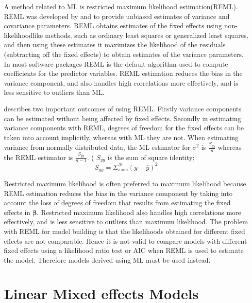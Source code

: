 \documentclass[12pt, a4paper]{report}
\theoremstyle{plain}
\theoremstyle{definition}
\theoremstyle{remark}
\begin{document}
A method related to ML is restricted maximum likelihood
estimation(REML). REML was developed by \citet*{PT71} and
\citet{Harville} to provide unbiased estimates of variance and
covariance parameters. REML obtains estimates of the fixed effects
using non-likelihoodlike methods, such as ordinary least squares
or generalized least squares, and then using these estimates it
maximizes the likelihood of the residuals (subtracting off the
fixed effects) to obtain estimates of the variance parameters. In
most software packages REML is the default algorithm used to
compute coefficients for the predictor variables. REML estimation
reduces the bias in the variance component, and also handles high
correlations more effectively, and is less sensitive to outliers
than ML.

\citet{McCullSearle} describes two important outcomes of using
REML. Firstly variance components can be estimated without being
affected by fixed effects. Secondly in estimating variance
components with REML, degrees of freedom for the fixed effects can
be taken into account implicitly, whereas with ML they are not.
When estimating variance from normally distributed data, the ML
estimator for $\sigma^{2}$ is $\frac{S_{yy}}{n}$ whereas the REML
estimator is $\frac{S_{yy}}{n-1}$. ( $S_{yy}$ is the sum of square
identity;
\begin{equation}
S_{yy} = \Sigma_{i=i}^{N} (y-\bar{y})^{2}
\end{equation}

Restricted maximum likelihood is often preferred to maximum likelihood because REML estimation reduces the bias in the variance component by taking into account the loss of degrees of freedom that results
from estimating the fixed effects in $\boldsymbol{\beta}$. Restricted maximum likelihood also handles high correlations more effectively, and is less sensitive to outliers than maximum likelihood.  The problem with REML for model building is that the likelihoods obtained for different fixed effects are not comparable. Hence it is not valid to compare models with different fixed effects using a likelihood ratio test or AIC when REML is used to
estimate the model. Therefore models derived using ML must be used instead.




\chapter{Linear Mixed effects Models}
\end{document}
